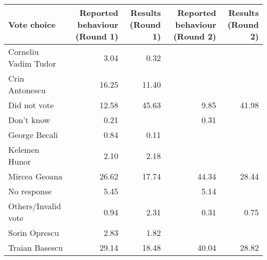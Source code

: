 
\begin{tabular}{l|r|r|r|r}
\hline
Vote choice & Reported behaviour (Round 1) & Results (Round 1) & Reported behaviour (Round 2) & Results (Round 2)\\
\hline
Corneliu Vadim Tudor & 3.04 & 0.32 &  & \\
\hline
Crin Antonescu & 16.25 & 11.40 &  & \\
\hline
Did not vote & 12.58 & 45.63 & 9.85 & 41.98\\
\hline
Don't know & 0.21 &  & 0.31 & \\
\hline
George Becali & 0.84 & 0.11 &  & \\
\hline
Kelemen Hunor & 2.10 & 2.18 &  & \\
\hline
Mircea Geoana & 26.62 & 17.74 & 44.34 & 28.44\\
\hline
No response & 5.45 &  & 5.14 & \\
\hline
Others/Invalid vote & 0.94 & 2.31 & 0.31 & 0.75\\
\hline
Sorin Oprescu & 2.83 & 1.82 &  & \\
\hline
Traian Basescu & 29.14 & 18.48 & 40.04 & 28.82\\
\hline
\end{tabular}
